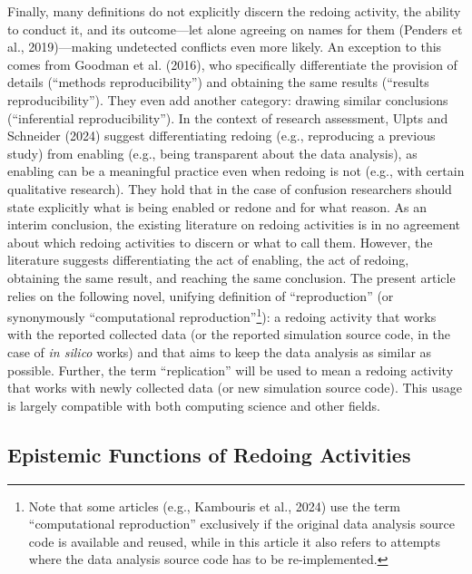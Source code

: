 \documentclass[authordate, empirical]{jote-new-article}
\begin{document}
	Finally, many definitions do not explicitly discern the redoing activity, the ability to conduct it, and its outcome—let alone agreeing on names for them (Penders et al., 2019)—making undetected conflicts even more likely. An exception to this comes from Goodman et al. (2016), who specifically differentiate the provision of details (“methods reproducibility”) and obtaining the same results (“results reproducibility”). They even add another category: drawing similar conclusions (“inferential reproducibility”). In the context of research assessment, Ulpts and Schneider (2024) suggest differentiating redoing (e.g., reproducing a previous study) from enabling (e.g., being transparent about the data analysis), as enabling can be a meaningful practice even when redoing is not (e.g., with certain qualitative research). They hold that in the case of confusion researchers should state explicitly what is being enabled or redone and for what reason. As an interim conclusion, the existing literature on redoing activities is in no agreement about which redoing activities to discern or what to call them. However, the literature suggests differentiating the act of enabling, the act of redoing, obtaining the same result, and reaching the same conclusion. The present article relies on the following novel, unifying definition of “reproduction” (or synonymously “computational reproduction”\footnote{ Note that some articles (e.g., Kambouris et al., 2024) use the term “computational reproduction” exclusively if the original data analysis source code is available and reused, while in this article it also refers to attempts where the data analysis source code has to be re-implemented.}): a redoing activity that works with the reported collected data (or the reported simulation source code, in the case of \emph{in silico} works) and that aims to keep the data analysis as similar as possible. Further, the term “replication” will be used to mean a redoing activity that works with newly collected data (or new simulation source code). This usage is largely compatible with both computing science and other fields.



	\subsection{Epistemic Functions of Redoing Activities}
\end{document}
